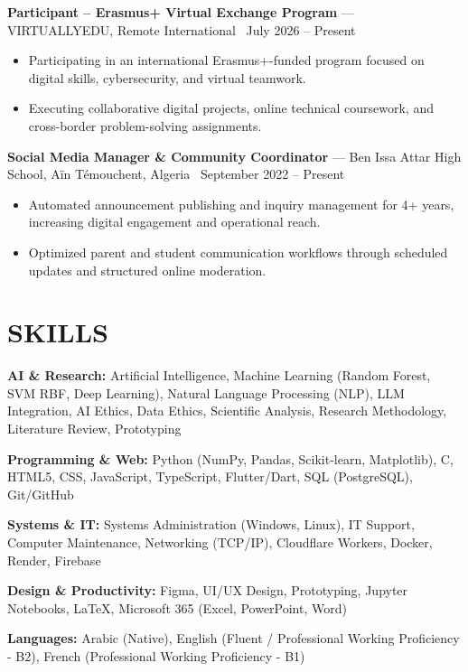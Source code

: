 \documentclass[10.5pt, letterpaper]{article}
\newcommand{\entry}[4]{%
  \noindent\textbf{#1} --- #3, #4 \textbar\ #2\par
  \vspace{2pt}
}
\newcommand{\resumeItem}[1]{\item #1}
\begin{document}
\entry{Participant -- Erasmus+ Virtual Exchange Program}{July 2026 -- Present}{VIRTUALLYEDU}{Remote International}
\begin{itemize}
  \resumeItem{Participating in an international Erasmus+-funded program focused on digital skills, cybersecurity, and virtual teamwork.}
  \resumeItem{Executing collaborative digital projects, online technical coursework, and cross-border problem-solving assignments.}
\end{itemize}

\entry{Social Media Manager \& Community Coordinator}{September 2022 -- Present}{Ben Issa Attar High School}{Aïn Témouchent, Algeria}
\begin{itemize}
  \resumeItem{Automated announcement publishing and inquiry management for 4+ years, increasing digital engagement and operational reach.}
  \resumeItem{Optimized parent and student communication workflows through scheduled updates and structured online moderation.}
\end{itemize}

\section{SKILLS}
\noindent\textbf{AI \& Research:} Artificial Intelligence, Machine Learning (Random Forest, SVM RBF, Deep Learning), Natural Language Processing (NLP), LLM Integration, AI Ethics, Data Ethics, Scientific Analysis, Research Methodology, Literature Review, Prototyping\par
\noindent\textbf{Programming \& Web:} Python (NumPy, Pandas, Scikit-learn, Matplotlib), C, HTML5, CSS, JavaScript, TypeScript, Flutter/Dart, SQL (PostgreSQL), Git/GitHub\par
\noindent\textbf{Systems \& IT:} Systems Administration (Windows, Linux), IT Support, Computer Maintenance, Networking (TCP/IP), Cloudflare Workers, Docker, Render, Firebase\par
\noindent\textbf{Design \& Productivity:} Figma, UI/UX Design, Prototyping, Jupyter Notebooks, LaTeX, Microsoft 365 (Excel, PowerPoint, Word)\par
\noindent\textbf{Languages:} Arabic (Native), English (Fluent / Professional Working Proficiency - B2), French (Professional Working Proficiency - B1)
\end{document}
